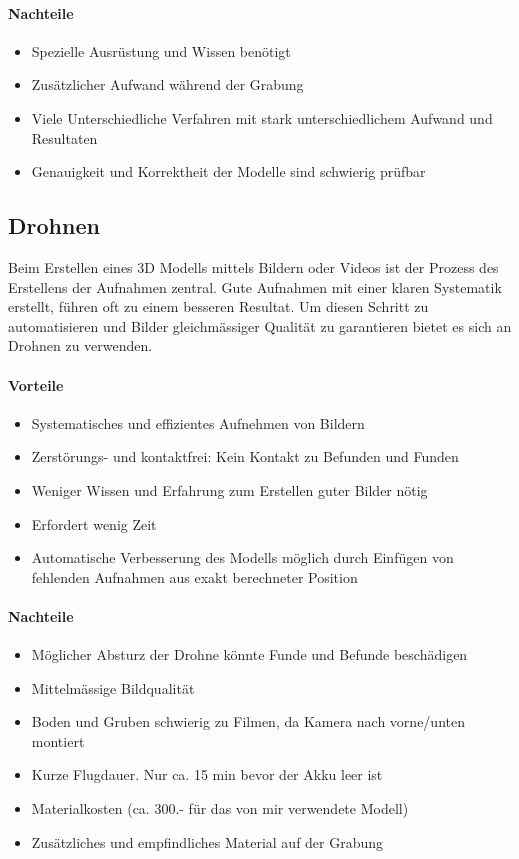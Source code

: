 \documentclass{paper}
\begin{document}
			\paragraph{Nachteile}
			\begin{itemize}
				\item
					Spezielle Ausrüstung und Wissen benötigt
				\item
					Zusätzlicher Aufwand während der Grabung
				\item
					Viele Unterschiedliche Verfahren mit stark unterschiedlichem Aufwand und Resultaten
				\item
					Genauigkeit und Korrektheit der Modelle sind schwierig prüfbar
			\end{itemize}
			
		\subsection{Drohnen}
			Beim Erstellen eines 3D Modells mittels Bildern oder Videos ist der Prozess des Erstellens der Aufnahmen zentral. Gute Aufnahmen mit einer klaren Systematik erstellt, führen oft zu einem besseren Resultat.
			Um diesen Schritt zu automatisieren und Bilder gleichmässiger Qualität zu garantieren bietet es sich an Drohnen zu verwenden.
			
			\paragraph{Vorteile}
			\begin{itemize}
				\item
					Systematisches und effizientes Aufnehmen von Bildern
				\item
					Zerstörungs- und kontaktfrei: Kein Kontakt zu Befunden und Funden
				\item
					Weniger Wissen und Erfahrung zum Erstellen guter Bilder nötig
				\item
					Erfordert wenig Zeit
				\item
					Automatische Verbesserung des Modells möglich durch Einfügen von fehlenden Aufnahmen aus exakt berechneter Position
			\end{itemize}
			
			\paragraph{Nachteile}
			\begin{itemize}
				\item
					Möglicher Absturz der Drohne könnte Funde und Befunde beschädigen
				\item
					Mittelmässige Bildqualität
				\item
					Boden und Gruben schwierig zu Filmen, da Kamera nach vorne/unten montiert
				\item
					Kurze Flugdauer. Nur ca. 15 min bevor der Akku leer ist
				\item
					Materialkosten (ca. 300.- für das von mir verwendete Modell)
				\item
					Zusätzliches und empfindliches Material auf der Grabung
			\end{itemize}
			
\end{document}
